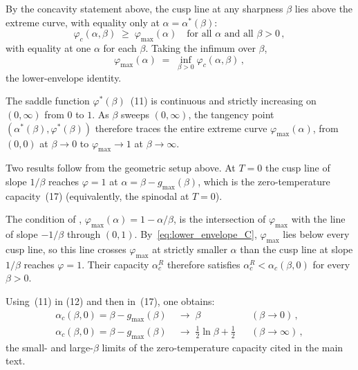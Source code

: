\documentclass[letterpaper]{article} %
\newcommand{\Bnet}{\beta}
\newcommand{\ac}{\alpha_c}
\begin{document}
By the concavity statement above, the cusp line at any sharpness $\Bnet$ lies above the extreme curve, with equality only at
$\alpha = \alpha^*(\Bnet)$:
\begin{equation}
\varphi_c(\alpha, \Bnet) \;\ge\; \varphi_{\max}(\alpha) \quad \text{for all $\alpha$ and all $\Bnet > 0$}\,,
\tag{49}
\end{equation}
with equality at one $\alpha$ for each $\Bnet$. Taking the infimum over $\Bnet$,
\begin{equation}
\varphi_{\max}(\alpha) \;=\; \inf_{\Bnet > 0} \varphi_c(\alpha, \Bnet)\,,
\tag{50}
\label{eq:lower_envelope_C}
\end{equation}
the lower-envelope identity.

The saddle function $\varphi^*(\Bnet)$~(11) is continuous and strictly increasing on $(0, \infty)$ from $0$ to $1$. As $\Bnet$ sweeps $(0, \infty)$,
the tangency point $(\alpha^*(\Bnet), \varphi^*(\Bnet))$ therefore traces the entire extreme curve $\varphi_{\max}(\alpha)$, from $(0, 0)$ at $\Bnet \to 0$ to $\varphi_{\max} \to 1$ at $\Bnet \to \infty$.

Two results follow from the geometric setup above.  At $T = 0$ the
cusp line of slope $1/\Bnet$ reaches $\varphi = 1$ at
$\alpha = \Bnet - g_{\max}(\Bnet)$, which is the zero-temperature
capacity~(17) (equivalently, the spinodal at
$T = 0$).

The condition of \citet{ramsauer2021hopfield},
$\varphi_{\max}(\alpha) = 1 - \alpha/\Bnet$, is the intersection of
$\varphi_{\max}$ with the line of slope $-1/\Bnet$ through $(0, 1)$.
By~\eqref{eq:lower_envelope_C}, $\varphi_{\max}$ lies below every
cusp line, so this line crosses $\varphi_{\max}$ at strictly
smaller $\alpha$ than the cusp line at slope $1/\Bnet$ reaches
$\varphi = 1$.  Their capacity $\alpha_c^R$ therefore satisfies
$\alpha_c^R < \alpha_c(\Bnet, 0)$ for every $\Bnet > 0$.

Using~(11) in
(12) and then in~(17), one obtains:
\begin{equation}
\begin{aligned}
\ac(\Bnet, 0) = \Bnet - g_{\max}(\Bnet) &\;\to\; \Bnet
   && (\Bnet \to 0)\,,\\
\ac(\Bnet, 0) = \Bnet - g_{\max}(\Bnet) &\;\to\; \tfrac{1}{2}\ln\Bnet + \tfrac{1}{2}
   && (\Bnet \to \infty)\,,
\end{aligned}
\tag{51}
\label{eq:asymptotic_C}
\end{equation}
the small- and large-$\Bnet$ limits of the zero-temperature capacity
cited in the main text.
\end{document}

